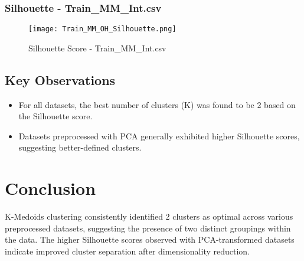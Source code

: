\documentclass{article}
\begin{document}
\subsubsection{Silhouette - Train\_MM\_Int.csv}

\begin{figure}[H]
    \centering
    \texttt{[image: Train\_MM\_OH\_Silhouette.png]}
    \caption{Silhouette Score - Train\_MM\_Int.csv}
    \label{fig:silhouette_mm_Int}
\end{figure}



\subsection{Key Observations}

\begin{itemize}
    \item For all datasets, the best number of clusters (K) was found to be 2 based on the Silhouette score.
    \item Datasets preprocessed with PCA generally exhibited higher Silhouette scores, suggesting better-defined clusters.
\end{itemize}

\section{Conclusion}

K-Medoids clustering consistently identified 2 clusters as optimal across various preprocessed datasets, suggesting the presence of two distinct groupings within the data. The higher Silhouette scores observed with PCA-transformed datasets indicate improved cluster separation after dimensionality reduction.
\end{document}
